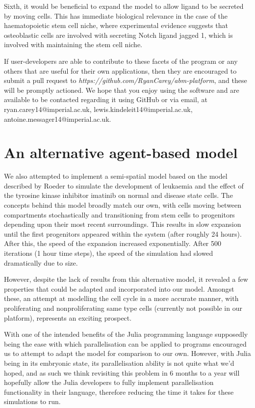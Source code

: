 \documentclass[12pt]{article}
\begin{document}
Sixth, it would be beneficial to expand the model to allow ligand to be 
secreted by moving cells. This has immediate biological relevance in the 
case of the haematopoietic stem cell niche, where experimental evidence 
suggests that osteoblastic cells are involved with secreting Notch 
ligand jagged 1, which is involved with maintaining the stem cell niche.
\cite{}

If user-developers are able to contribute to these facets of the program 
or any others that are useful for their own applications, then they are 
encouraged to submit a pull request to {\itshape 
https://github.com/RyanCarey/abm-platform}, and these will be
promptly actioned. We hope that you enjoy using the software 
and are available to be contacted regarding it using GitHub or via 
email, at ryan.carey14@imperial.ac.uk, 
lewis.kindeleit14@imperial.ac.uk, 
antoine.messager14@imperial.ac.uk.

\newpage

\section{An alternative agent-based model}

We also attempted to implement a semi-spatial model based on the model 
described by Roeder to simulate the development of leukaemia and the 
effect of the tyrosine kinase inhibitor imatinib on normal and disease 
state cells. The concepts behind this model broadly match our own, with 
cells moving between compartments stochastically and transitioning from 
stem cells to progenitors depending upon their most recent surroundings. 
This results in slow expansion until the first progenitors appeared 
within the system (after roughly 24 hours). After this, the speed of the 
expansion increased exponentially. After 500 iterations (1 hour time 
steps), the speed of the simulation had slowed dramatically due to size.

However, despite the lack of results from this alternative model, it 
revealed a few properties that could be adapted and incorporated into 
our model. Amongst these, an attempt at modelling the cell cycle in a 
more accurate manner, with proliferating and nonproliferating same type 
cells (currently not possible in our platform), represents an exciting 
prospect.

With one of the intended benefits of the Julia programming language 
supposedly being the ease with which parallelisation can be applied to 
programs encouraged us to attempt to adapt the model for comparison to 
our own. However, with Julia being in its embryonic state, its 
parallelisation ability is not quite what we'd hoped, and as such we 
think revisiting this problem in 6 months to a year will hopefully allow 
the Julia developers to fully implement parallelisation functionality in 
their language, therefore reducing the time it takes for these 
simulations to run.
\end{document}
